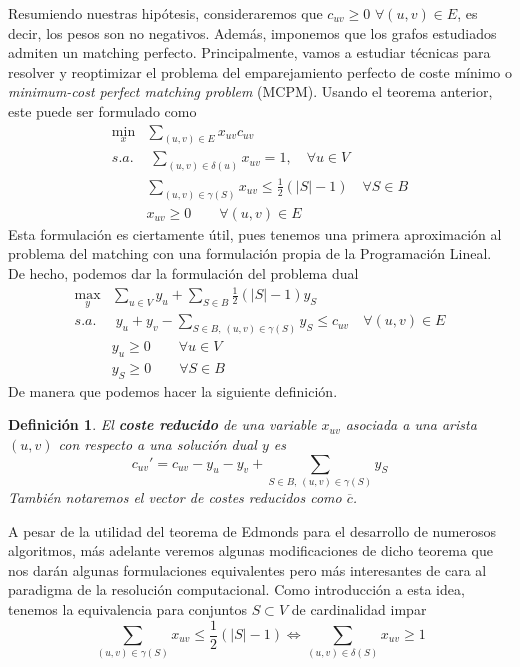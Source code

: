 \documentclass[twoside,a4paper,openright,12pt]{book}
\newtheorem{defi}{Definici\'on}[section]
\begin{document}
Resumiendo nuestras hipótesis, consideraremos que $c_{uv}\geq 0$ $\forall (u,v)\in E$, es decir, los pesos son no negativos. Además, imponemos que los grafos estudiados admiten un matching perfecto. Principalmente, vamos a estudiar técnicas para resolver y reoptimizar el problema del emparejamiento perfecto de coste mínimo o \textit{minimum-cost perfect matching problem} (MCPM). Usando el teorema anterior, este puede ser formulado como
\begin{align*}
\min_x & \sum_{(u,v) \in E}x_{uv}c_{uv}\\
s.a.&\;\sum_{(u,v)\in\delta(u)} x_{uv} = 1, \quad \forall u \in V\\
&\sum_{(u,v)\in \gamma(S)} x_{uv} \leq \frac{1}{2}(|S|-1)\quad \forall S \in B	\\
&x_{uv} \geq 0 \qquad \forall(u,v)\in E
\end{align*}
Esta formulación es ciertamente útil, pues tenemos una primera aproximación al problema del matching con una formulación propia de la Programación Lineal. De hecho, podemos dar la formulación del problema dual
\begin{align*}
\max_y & \sum_{u\in V}y_u + \sum_{S\in B}\frac{1}{2}(|S|-1)y_S\\
s.a.&\;y_u+y_v - \sum_{S\in B,\,(u,v)\in \gamma(S)} y_S \leq c_{uv} \quad \forall (u,v)\in E\\
&y_u \geq 0 \qquad \forall u\in V\\
&y_S \geq 0 \qquad \forall S\in B
\end{align*}
De manera que podemos hacer la siguiente definición.
\begin{defi}
El \textbf{coste reducido} de una variable $x_{uv}$ asociada a una arista $(u,v)$ con respecto a una solución dual $y$ es
$$
c_{uv}' = c_{uv} -y_u - y_v + \sum_{S\in B,\,(u,v)\in \gamma(S)}y_S 
$$
También notaremos el vector de costes reducidos como $\overline{c}$.
\end{defi}

A pesar de la utilidad del teorema de Edmonds para el desarrollo de numerosos algoritmos, más adelante veremos algunas modificaciones de dicho teorema que nos darán algunas formulaciones equivalentes pero más interesantes de cara al paradigma de la resolución computacional. Como introducción a esta idea, tenemos la equivalencia para conjuntos $S\subset V$ de cardinalidad impar
$$
\sum_{(u,v)\in \gamma(S)} x_{uv} \leq \frac{1}{2}(|S|-1) \Leftrightarrow \sum_{(u,v)\in \delta(S)} x_{uv} \geq 1
$$
\end{document}
